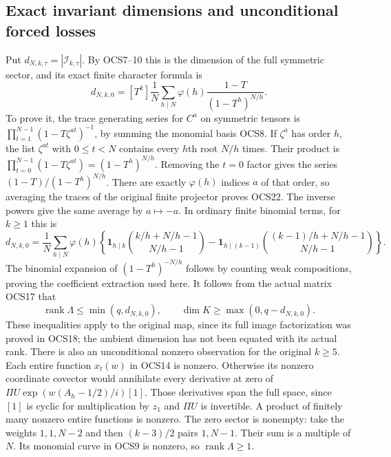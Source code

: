 \documentclass[11pt,a4paper]{article}
\begin{document}
\subsection{Exact invariant dimensions and unconditional forced losses}
Put $d_{N,k,\tau}=|\mathcal I_{k,\tau}|$.
By OCS7--10 this is the dimension of the full symmetric sector,
and its exact finite character formula is
\[
 d_{N,k,0}=[T^k]\frac1N
       \sum_{h\mid N}\varphi(h)\frac{1-T}{(1-T^h)^{N/h}}.
 \tag{OCS22}
\]
To prove it, the trace generating series for $C^a$ on symmetric
tensors is
$\prod_{t=1}^{N-1}(1-T\zeta^{at})^{-1}$, by summing the
monomial basis OCS8. If $\zeta^a$ has order $h$, the list
$\zeta^{at}$ with $0\leq t<N$ contains every $h$th root
$N/h$ times. Their product is
$\prod_{t=0}^{N-1}(1-T\zeta^{at})=(1-T^h)^{N/h}$.
Removing the $t=0$ factor gives the series
$(1-T)/(1-T^h)^{N/h}$. There are exactly $\varphi(h)$
indices $a$ of that order, so averaging the traces of the
original finite projector proves OCS22. The inverse powers
give the same average by $a\mapsto-a$.
In ordinary finite binomial terms, for $k\geq1$ this is
\[
 d_{N,k,0}=\frac1N\sum_{h\mid N}\varphi(h)
 \left\{
 \mathbf1_{h\mid k}\binom{k/h+N/h-1}{N/h-1}
 -\mathbf1_{h\mid(k-1)}
                  \binom{(k-1)/h+N/h-1}{N/h-1}
 \right\}.
 \tag{OCS23}
\]
The binomial expansion of $(1-T^h)^{-N/h}$ follows by
counting weak compositions, proving the coefficient extraction
used here. It follows from the actual matrix OCS17 that
\[
 \operatorname{rank}\Lambda\leq\min(q,d_{N,k,0}),
 \qquad \dim K\geq\max(0,q-d_{N,k,0}).
 \tag{OCS24}
\]
These inequalities apply to the original map, since its full
image factorization was proved in OCS18; the ambient dimension
has not been equated with its actual rank.
There is also an unconditional nonzero observation for the
original $k\geq5$. Each entire function $x_t(w)$ in OCS14 is
nonzero. Otherwise its nonzero coordinate covector would
annihilate every derivative at zero of
$\Pi U\exp(w(A_h-1/2)/i)[1]$. Those derivatives span the full
space, since $[1]$ is cyclic for multiplication by $z_1$ and
$\Pi U$ is invertible. A product of finitely many nonzero entire
functions is nonzero. The zero sector is nonempty: take the
weights $1,1,N-2$ and then $(k-3)/2$ pairs $1,N-1$.
Their sum is a multiple of $N$. Its monomial curve in OCS9
is nonzero, so $\operatorname{rank}\Lambda\geq1$.
\end{document}
